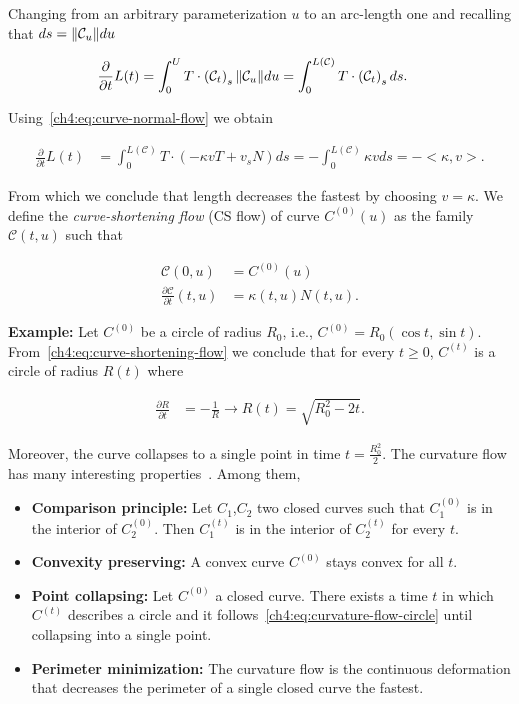 Changing from an arbitrary parameterization $u$ to an arc-length one and recalling that $ds=\lVert \mathcal{C}_u \rVert  du$

\begin{align*}
	\frac{\partial }{\partial t}L(t) &= \int_{0}^{U}{ T \cdot \left( \mathcal{C}_{t} \right)_s \lVert \mathcal{C}_u \rVert  du} = \int_{0}^{L(\mathcal{C})}{ T \cdot \left( \mathcal{C}_{t} \right)_s ds}. 	
\end{align*}

Using~\cref{ch4:eq:curve-normal-flow} we obtain

\begin{align*}
	\frac{\partial }{\partial t}L(t) &= \int_{0}^{L(\mathcal{C})}{T \cdot (-\kappa vT + v_sN) ds } = - \int_{0}^{L(\mathcal{C})}{\kappa v ds} = -<\kappa,v>.
\end{align*}

From which we conclude that length decreases the fastest by choosing $v=\kappa$. We define the \emph{curve-shortening flow} (CS flow) of curve $C^{(0)}(u)$ as the family $\mathcal{C}(t,u)$ such that

\begin{align}
	\mathcal{C}(0,u) & = C^{(0)}(u) \\
	\frac{\partial \mathcal{C}}{\partial t}(t,u) &= \kappa(t,u) N(t,u).
	\label{ch4:eq:curve-shortening-flow}
\end{align}


\textbf{Example:} Let $C^{(0)}$ be a circle of radius $R_0$, i.e.,  $C^{(0)} = R_0( \cos t, \sin t)$. From~\cref{ch4:eq:curve-shortening-flow} we conclude that for every $t \geq 0$, $C^{(t)}$ is a circle of radius $R(t)$ where

\begin{align}
	\frac{\partial R}{\partial t} &= -\frac{1}{R}  \rightarrow R(t) = \sqrt{R_0^2 - 2t}.
	\label{ch4:eq:curvature-flow-circle}
\end{align}

Moreover, the curve collapses to a single point in time $t=\frac{R_0^2}{2}$. The curvature flow has many interesting properties~\cite{huisken84flow,gage86heat,ecker08heat}. Among them,

\begin{itemize}
	\item[]{\textbf{Comparison principle:} Let $C_1$,$C_2$ two closed curves such that $C_1^{(0)}$ is in the interior of $C_2^{(0)}$. Then $C_1^{(t)}$ is in the interior of $C_2^{(t)}$ for every $t$.}
	\item[]{\textbf{Convexity preserving:} A convex curve $C^{(0)}$ stays convex for all $t$.}
	\item[]{\textbf{Point collapsing:} Let $C^{(0)}$ a closed curve. There exists a time $t$ in which $C^{(t)}$ describes a circle and it follows~\cref{ch4:eq:curvature-flow-circle} until collapsing into a single point.}
	\item[]{\textbf{Perimeter minimization:} The curvature flow is the continuous deformation that decreases the perimeter of a single closed curve the fastest.}
\end{itemize}


